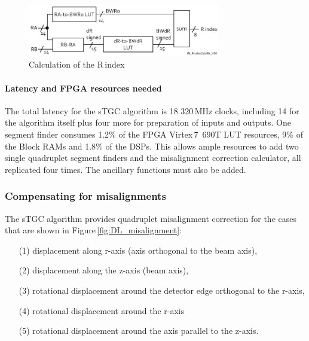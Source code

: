 \begin{figure}[h]
   \centering
   \includegraphics[width=0.75\textwidth]{figures/JN_RindexCalcBlk_V02.pdf}
   \caption{Calculation of the R\,index}
   \label{fig:JN_RindexCalcBlk}
\end{figure}

\vspace{-3mm}
\paragraph{Latency and FPGA resources needed}
The total latency for the sTGC algorithm is 18 320\,MHz clocks, including 14 for the algorithm itself plus four more for preparation of inputs and outputs.
One segment finder consumes 1.2\% of the FPGA Virtex\,7~690T LUT resources, 9\% of the Block RAMs and 1.8\% of the DSPs.
This allows ample resources to add two single quadruplet segment finders and the misalignment correction calculator, all replicated four times.
The ancillary functions must also be added.

%
%

\FloatBarrier

\subsubsection{Compensating for misalignments}

The sTGC algorithm provides quadruplet misalignment correction for the cases that are shown in Figure\,\ref{fig:DL_misalignment}:
\begin{enumerate}\itemsep-6pt
\item[(1)] displacement along r-axis (axis orthogonal to the beam axis),
\item[(2)] displacement along the z-axis (beam axis),
\item[(3)] rotational displacement around the detector edge orthogonal to the r-axis,
\item[(4)] rotational displacement around the r-axis
\item[(5)] rotational displacement around the axis parallel to the z-axis.
\end{enumerate}

